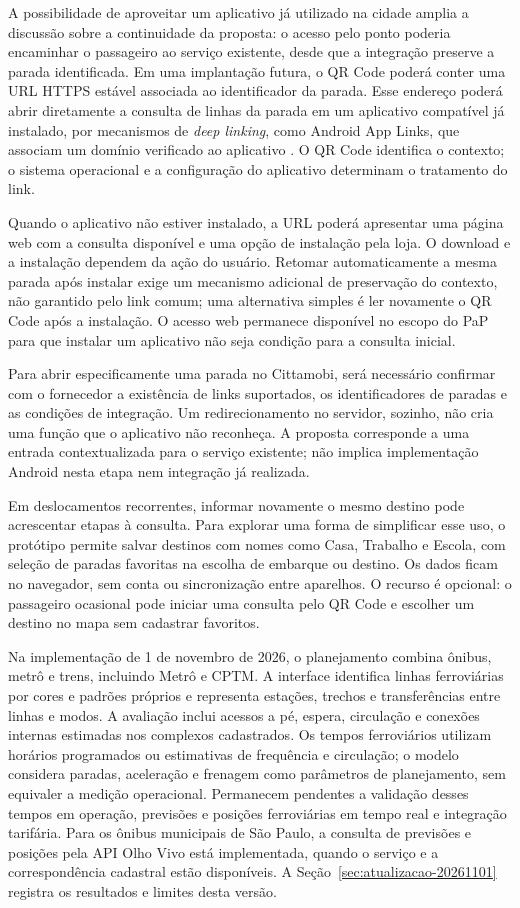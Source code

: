 \documentclass[12pt,oneside,a4paper,brazil,chapter=TITLE]{abntex2}
\begin{document}
A possibilidade de aproveitar um aplicativo já utilizado na cidade amplia a discussão sobre a continuidade da proposta: o acesso pelo ponto poderia encaminhar o passageiro ao serviço existente, desde que a integração preserve a parada identificada. Em uma implantação futura, o QR Code poderá conter uma URL HTTPS estável associada ao identificador da parada. Esse endereço poderá abrir diretamente a consulta de linhas da parada em um aplicativo compatível já instalado, por mecanismos de \textit{deep linking}, como Android App Links, que associam um domínio verificado ao aplicativo \citep{androidapplinks}. O QR Code identifica o contexto; o sistema operacional e a configuração do aplicativo determinam o tratamento do link.

Quando o aplicativo não estiver instalado, a URL poderá apresentar uma página web com a consulta disponível e uma opção de instalação pela loja. O download e a instalação dependem da ação do usuário. Retomar automaticamente a mesma parada após instalar exige um mecanismo adicional de preservação do contexto, não garantido pelo link comum; uma alternativa simples é ler novamente o QR Code após a instalação. O acesso web permanece disponível no escopo do PaP para que instalar um aplicativo não seja condição para a consulta inicial.

Para abrir especificamente uma parada no Cittamobi, será necessário confirmar com o fornecedor a existência de links suportados, os identificadores de paradas e as condições de integração. Um redirecionamento no servidor, sozinho, não cria uma função que o aplicativo não reconheça. A proposta corresponde a uma entrada contextualizada para o serviço existente; não implica implementação Android nesta etapa nem integração já realizada.

Em deslocamentos recorrentes, informar novamente o mesmo destino pode acrescentar etapas à consulta. Para explorar uma forma de simplificar esse uso, o protótipo permite salvar destinos com nomes como Casa, Trabalho e Escola, com seleção de paradas favoritas na escolha de embarque ou destino. Os dados ficam no navegador, sem conta ou sincronização entre aparelhos. O recurso é opcional: o passageiro ocasional pode iniciar uma consulta pelo QR Code e escolher um destino no mapa sem cadastrar favoritos.

Na implementação de 1 de novembro de 2026, o planejamento combina ônibus, metrô e trens, incluindo Metrô e CPTM. A interface identifica linhas ferroviárias por cores e padrões próprios e representa estações, trechos e transferências entre linhas e modos. A avaliação inclui acessos a pé, espera, circulação e conexões internas estimadas nos complexos cadastrados. Os tempos ferroviários utilizam horários programados ou estimativas de frequência e circulação; o modelo considera paradas, aceleração e frenagem como parâmetros de planejamento, sem equivaler a medição operacional. Permanecem pendentes a validação desses tempos em operação, previsões e posições ferroviárias em tempo real e integração tarifária. Para os ônibus municipais de São Paulo, a consulta de previsões e posições pela API Olho Vivo está implementada, quando o serviço e a correspondência cadastral estão disponíveis. A Seção~\ref{sec:atualizacao-20261101} registra os resultados e limites desta versão.
\end{document}
